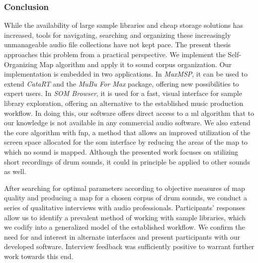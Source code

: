 \subsubsection{Conclusion}
\label{subsubsec:discussion_conclusion}
While the availability of large sample libraries and cheap storage solutions has
increased, tools for navigating, searching and organizing these increasingly
unmanageable audio file collections have not kept pace. The present thesis
approaches this problem from a practical perspective. We implement the
Self-Organizing Map algorithm and apply it to sound corpus organization. Our
implementation is embedded in two applications. In \textit{MaxMSP}, it can be
used to extend \textit{CataRT} and the \textit{MuBu For Max} package, offering
new possibilities to expert users. In \textit{SOM Browser}, it is used for a
fast, visual interface for sample library exploration, offering an alternative
to the established music production workflow. In doing this, our software offers
direct access to a \gls{ml} algorithm that to our knowledge is not available in
any commercial audio software. We also extend the core algorithm with \gls{fnp},
a method that allows an improved utilization of the screen space allocated for
the \gls{som} interface by reducing the areas of the map to which no sound is
mapped. Although the presented work focuses on utilizing short recordings of
drum sounds, it could in principle be applied to other sounds as well.

\smallskip


After searching for optimal parameters according to objective measures of map
quality and producing a map for a chosen corpus of drum sounds, we conduct a
series of qualitative interviews with audio professionals. Participants'
responses allow us to identify a prevalent method of working with sample
libraries, which we codify into a generalized model of the established workflow.
We confirm the need for and interest in alternate interfaces and present
participants with our developed software. Interview feedback was sufficiently
positive to warrant further work towards this end.
